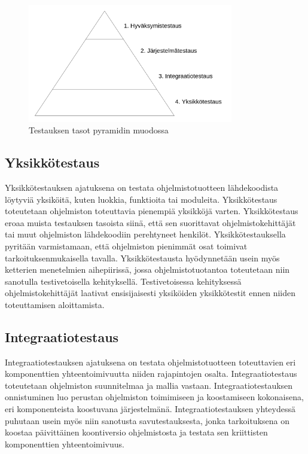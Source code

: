 \begin{figure}[H]
  \centering
  \includegraphics[width=0.8\textwidth]{assets/testing-levels-pyramid.png}
  \caption{Testauksen tasot pyramidin muodossa}
  \label{fig:testing-levels-pyramid}
\end{figure}

  \subsection{Yksikkötestaus} \label{07_yksikkotestaus}

  Yksikkötestauksen ajatuksena on testata ohjelmistotuotteen lähdekoodista löytyviä yksiköitä, kuten luokkia, funktioita tai moduleita.
  Yksikkötestaus toteutetaan ohjelmiston toteuttavia pienempiä yksikköjä varten.
  Yksikkötestaus eroaa muista testauksen tasoista siinä, että sen suorittavat ohjelmistokehittäjät tai muut ohjelmiston lähdekoodiin perehtyneet henkilöt.
  Yksikkötestauksella pyritään varmistamaan, että ohjelmiston pienimmät osat toimivat tarkoituksenmukaisella tavalla.
  Yksikkötestausta hyödynnetään usein myös ketterien menetelmien aihepiirissä, jossa ohjelmistotuotantoa toteutetaan niin sanotulla testivetoisella kehityksellä.
  Testivetoisessa kehityksessä ohjelmistokehittäjät laativat ensisijaisesti yksiköiden yksikkötestit ennen niiden toteuttamisen aloittamista.

  \subsection{Integraatiotestaus} \label{07_integraatiotestaus}

  Integraatiotestauksen ajatuksena on testata ohjelmistotuotteen toteuttavien eri komponenttien yhteentoimivuutta niiden rajapintojen osalta.
  Integraatiotestaus toteutetaan ohjelmiston suunnitelmaa ja mallia vastaan.
  Integraatiotestauksen onnistuminen luo perustan ohjelmiston toimimiseen ja koostamiseen kokonaisena, eri komponenteista koostuvana järjestelmänä.
  Integraatiotestauksen yhteydessä puhutaan usein myös niin sanotusta savutestauksesta, jonka tarkoituksena on koostaa päivittäinen koontiversio ohjelmistosta ja testata sen kriittisten komponenttien yhteentoimivuus.

